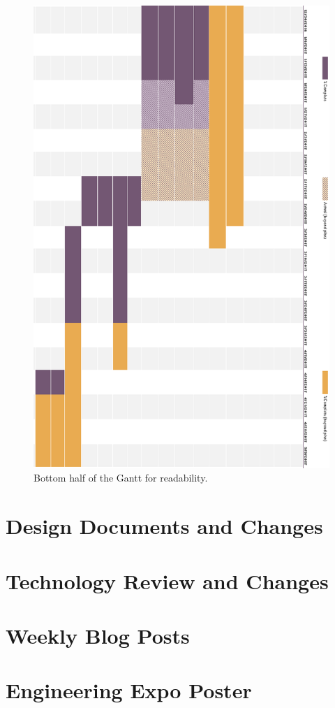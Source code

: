 \documentclass[letterpaper,10pt,titlepage,draftclsnofoot,onecolumn,onesided] {IEEEtran}
\begin{document}
\begin{figure}[h]
	\centering
	\includegraphics[width=.75\textwidth]{GanttBottom}
	\caption{Bottom half of the Gantt for readability.}
\end{figure}


\section{Design Documents and Changes}


\section{Technology Review and Changes}


\section{Weekly Blog Posts}
		
		
	

\section{Engineering Expo Poster}
\end{document}
